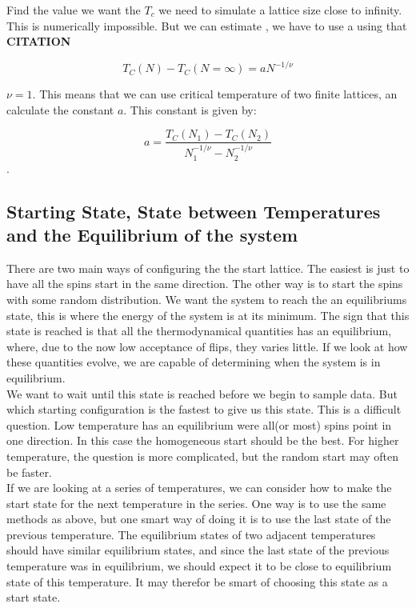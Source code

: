 \documentclass[a4paper, 10pt]{article}
\begin{document}
Find the value we want the $T_c$ we need to simulate a lattice size close to infinity. This is numerically impossible. But we can estimate , we have to use a using that \textbf{CITATION}

\begin{equation}\label{eq:Critical_temp_at_infinite}
T_C(N)-T_C(N=\infty)=aN^{-1/\nu}
\end{equation}

$\nu = 1$. This means that we can use critical temperature of two finite lattices, an calculate the constant $a$. This constant is given by:

\begin{equation}\label{eq:a:equation}
a=\frac{T_C(N_1)-T_C(N_2)}{N_1^{-1/\nu}-N_2^{-1/\nu}}
\end{equation}.



\subsection{Starting State, State between Temperatures and the Equilibrium of the system}\label{equilibrium_system}

There are two main ways of configuring the the start lattice. The easiest is just to have all the spins start in the same direction. The other way is to start the spins with some random distribution. We want the system to reach the an equilibriums state, this is where the energy of the system is at its minimum. The sign that this state is reached is that all the thermodynamical quantities has an equilibrium, where, due to the now low acceptance of flips, they varies little. If we look at how these quantities evolve, we are capable of determining when the system is in equilibrium.\\

We want to wait until this state is reached before we begin to sample data. But which starting configuration is the fastest to give us this state. This is a difficult question. Low temperature has an equilibrium were all(or most) spins point in one direction. In this case the homogeneous start should be the best. For higher temperature, the question is more complicated, but the random start may often be faster. \\

If we are looking at a series of temperatures, we can consider how to make the start state for the next temperature in the series. One way is to use the same methods as above, but one smart way of doing it is to use the last state of the previous temperature. The equilibrium states of two adjacent temperatures should have similar equilibrium states, and since the last state of the previous temperature was in equilibrium, we should expect it to be close to equilibrium state of this temperature. It may therefor be smart of choosing this state as a start state.
\end{document}
